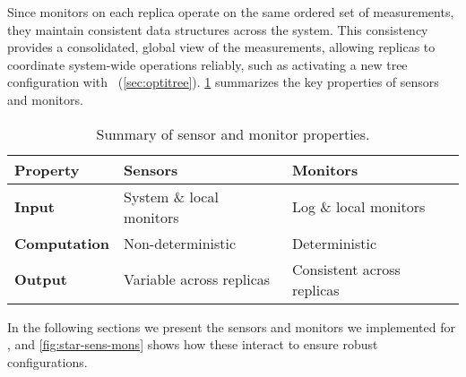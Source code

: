 \noindent
Since monitors on each replica operate on the same ordered set of measurements, they maintain consistent data structures across the system.
This consistency provides a consolidated, global view of the measurements, allowing replicas to coordinate system-wide operations reliably, such as activating a new tree configuration with \optitree~(\cref{sec:optitree}).
\cref{tab:sensors_monitors} summarizes the key properties of sensors and monitors.

\begin{table}[htb]
  \footnotesize
  \centering
  \caption{Summary of sensor and monitor properties.}
  \label{tab:sensors_monitors}
  \begin{tabular}{@{}p{1.8cm}|p{2.9cm}p{2.9cm}@{}}
    \toprule
    \textbf{Property}        & \textbf{Sensors}          & \textbf{Monitors}          \\ \midrule
    \textbf{Input}           & System \& local monitors  & Log \& local monitors      \\
    \textbf{Computation}     & Non-deterministic         & Deterministic              \\
    \textbf{Output}          & Variable across replicas  & Consistent across replicas \\
    \bottomrule
  \end{tabular}
\end{table}

\noindent
In the following sections we present the sensors and monitors we implemented for \sysname, and \cref{fig:star-sens-mons} shows how these interact to ensure robust configurations.

\begin{figure*}[hbt]
  \centering
  
  \caption{Connections between Replica \na's sensors and monitors.}
  \label{fig:star-sens-mons}
\end{figure*}
